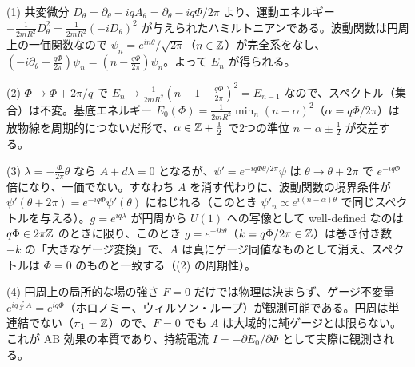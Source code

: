 \begin{solution}
(1) 共変微分 $D_\theta=\partial_\theta-iqA_\theta=\partial_\theta-iq\Phi/2\pi$ より、運動エネルギー $-\frac{1}{2mR^2}D_\theta^2=\frac{1}{2mR^2}(-iD_\theta)^2$ が与えられたハミルトニアンである。波動関数は円周上の一価関数なので $\psi_n=e^{in\theta}/\sqrt{2\pi}$（$n\in\mathbb{Z}$）が完全系をなし、$(-i\partial_\theta-\tfrac{q\Phi}{2\pi})\psi_n=(n-\tfrac{q\Phi}{2\pi})\psi_n$。よって $E_n$ が得られる。

(2) $\Phi\to\Phi+2\pi/q$ で $E_n\to\frac{1}{2mR^2}(n-1-\frac{q\Phi}{2\pi})^2=E_{n-1}$ なので、スペクトル（集合）は不変。基底エネルギー $E_0(\Phi)=\frac{1}{2mR^2}\min_n(n-\alpha)^2$（$\alpha=q\Phi/2\pi$）は放物線を周期的につないだ形で、$\alpha\in\mathbb{Z}+\tfrac12$ で2つの準位 $n=\alpha\pm\tfrac12$ が交差する。
\begin{center}
\end{center}

(3) $\lambda=-\frac{\Phi}{2\pi}\theta$ なら $A+d\lambda=0$ となるが、$\psi'=e^{-iq\Phi\theta/2\pi}\psi$ は $\theta\to\theta+2\pi$ で $e^{-iq\Phi}$ 倍になり、一価でない。すなわち $A$ を消す代わりに、波動関数の境界条件が $\psi'(\theta+2\pi)=e^{-iq\Phi}\psi'(\theta)$ にねじれる（このとき $\psi'_n\propto e^{i(n-\alpha)\theta}$ で同じスペクトルを与える）。$g=e^{iq\lambda}$ が円周から $U(1)$ への写像として well-defined なのは $q\Phi\in2\pi\mathbb{Z}$ のときに限り、このとき $g=e^{-ik\theta}$（$k=q\Phi/2\pi\in\mathbb{Z}$）は巻き付き数 $-k$ の「大きなゲージ変換」で、$A$ は真にゲージ同値なものとして消え、スペクトルは $\Phi=0$ のものと一致する（(2) の周期性）。

(4) 円周上の局所的な場の強さ $F=0$ だけでは物理は決まらず、ゲージ不変量 $e^{iq\oint A}=e^{iq\Phi}$（ホロノミー、ウィルソン・ループ）が観測可能である。円周は単連結でない（$\pi_1=\mathbb{Z}$）ので、$F=0$ でも $A$ は大域的に純ゲージとは限らない。これが AB 効果の本質であり、持続電流 $I=-\partial E_0/\partial\Phi$ として実際に観測される。
\end{solution}

